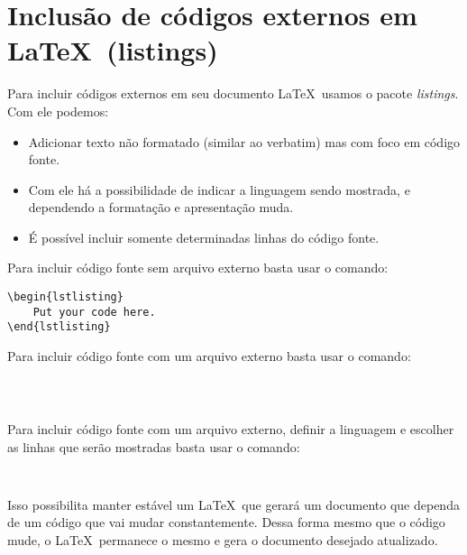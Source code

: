 \section[Inclusão de códigos externos em \LaTeX]{Inclusão de códigos externos em \LaTeX~(listings)}

\begin{frame}[fragile]
\begin{block}{}
Para incluir códigos externos em seu documento \LaTeX~usamos o pacote {\it listings}. Com ele podemos:
\begin{itemize}
 \item Adicionar texto não formatado (similar ao verbatim) mas com foco em código fonte.
 \item Com ele há a possibilidade de indicar a linguagem sendo mostrada, e dependendo a formatação e apresentação muda.
 \item É possível incluir somente determinadas linhas do código fonte.
\end{itemize}
\end{block}
\end{frame}


\begin{frame}[fragile]

Para incluir código fonte sem arquivo externo basta usar o comando: 

\begin{verbatim}
\begin{lstlisting} 
    Put your code here. 
\end{lstlisting}
\end{verbatim}


\end{frame}


\begin{frame}[fragile]

Para incluir código fonte com um arquivo externo basta usar o comando: 

\begin{verbatim}
 


\end{verbatim}


\end{frame}

\begin{frame}[fragile]

Para incluir código fonte com um arquivo externo, definir a linguagem e escolher as linhas que serão mostradas basta usar o comando: 

\begin{verbatim} 


\end{verbatim}

Isso possibilita manter estável um \LaTeX~que gerará um documento que dependa de um código que vai mudar constantemente. Dessa forma mesmo que o código mude, o \LaTeX~permanece o mesmo e gera o documento desejado atualizado.


\end{frame}


